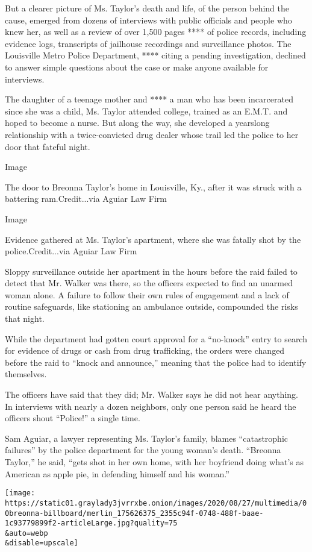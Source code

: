 But a clearer picture of Ms. Taylor's death and life, of the person
behind the cause, emerged from dozens of interviews with public
officials and people who knew her, as well as a review of over 1,500
pages **** of police records, including evidence logs, transcripts of
jailhouse recordings and surveillance photos. The Louisville Metro
Police Department, **** citing a pending investigation, declined to
answer simple questions about the case or make anyone available for
interviews.

The daughter of a teenage mother and **** a man who has been
incarcerated since she was a child, Ms. Taylor attended college, trained
as an E.M.T. and hoped to become a nurse. But along the way, she
developed a yearslong relationship with a twice-convicted drug dealer
whose trail led the police to her door that fateful night.

Image

The door to Breonna Taylor's home in Louisville, Ky., after it was
struck with a battering ram.Credit...via Aguiar Law Firm

Image

Evidence gathered at Ms. Taylor's apartment, where she was fatally shot
by the police.Credit...via Aguiar Law Firm

Sloppy surveillance outside her apartment in the hours before the raid
failed to detect that Mr. Walker was there, so the officers expected to
find an unarmed woman alone. A failure to follow their own rules of
engagement and a lack of routine safeguards, like stationing an
ambulance outside, compounded the risks that night.

While the department had gotten court approval for a ``no-knock'' entry
to search for evidence of drugs or cash from drug trafficking, the
orders were changed before the raid to ``knock and announce,'' meaning
that the police had to identify themselves.

The officers have said that they did; Mr. Walker says he did not hear
anything. In interviews with nearly a dozen neighbors, only one person
said he heard the officers shout ``Police!'' a single time.

Sam Aguiar, a lawyer representing Ms. Taylor's family, blames
``catastrophic failures'' by the police department for the young woman's
death. ``Breonna Taylor,'' he said, ``gets shot in her own home, with
her boyfriend doing what's as American as apple pie, in defending
himself and his woman.''

\texttt{[image: https://static01.graylady3jvrrxbe.onion/images/2020/08/27/multimedia/00breonna-billboard/merlin\_175626375\_2355c94f-0748-488f-baae-1c93779899f2-articleLarge.jpg?quality=75\\\&auto=webp\\\&disable=upscale]}

